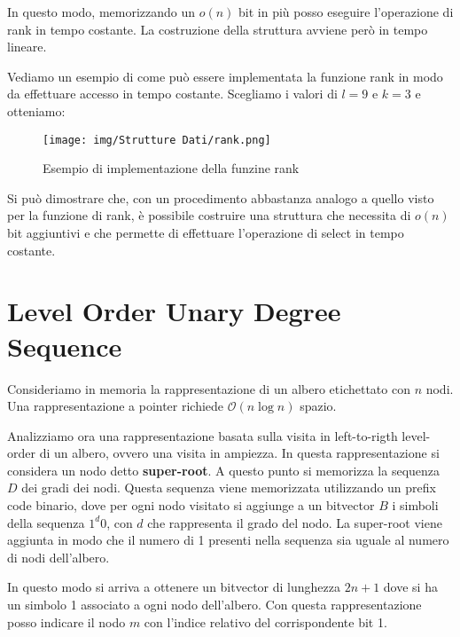 In questo modo, memorizzando un $o(n)$ bit in più posso eseguire l'operazione di rank in tempo costante. La costruzione della struttura avviene però in tempo lineare.
\begin{esempio}
    Vediamo un esempio di come può essere implementata la funzione rank in modo da effettuare accesso in tempo costante. Scegliamo i valori di $l = 9$ e $k = 3$ e otteniamo:
    \begin{figure}[!ht]
        \centering
        \texttt{[image: img/Strutture Dati/rank.png]}
        \caption{Esempio di implementazione della funzine rank}
    \end{figure}
\end{esempio}
\begin{osservazione}
    Si può dimostrare che, con un procedimento abbastanza analogo a quello visto per la funzione di rank, è possibile costruire una struttura che necessita di $o(n)$ bit aggiuntivi e che permette di effettuare l'operazione di select in tempo costante.
\end{osservazione}
\section{Level Order Unary Degree Sequence}
Consideriamo in memoria la rappresentazione di un albero etichettato con $n$ nodi. Una rappresentazione a pointer richiede $\mathcal{O}(n \log n)$ spazio. 

Analizziamo ora una rappresentazione basata sulla visita in left-to-rigth level-order di un albero, ovvero una visita in ampiezza. In questa rappresentazione si considera un nodo detto \textbf{super-root}. A questo punto si memorizza la sequenza $D$ dei gradi dei nodi. Questa sequenza viene memorizzata utilizzando un prefix code binario, dove per ogni nodo visitato si aggiunge a un bitvector $B$ i simboli della sequenza $1^d0$, con $d$ che rappresenta il grado del nodo. La super-root viene aggiunta in modo che il numero di 1 presenti nella sequenza sia uguale al numero di nodi dell'albero.

In questo modo si arriva a ottenere un bitvector di lunghezza $2n + 1$ dove si ha un simbolo 1 associato a ogni nodo dell'albero. Con questa rappresentazione posso indicare il nodo $m$ con l'indice relativo del corrispondente bit 1.

